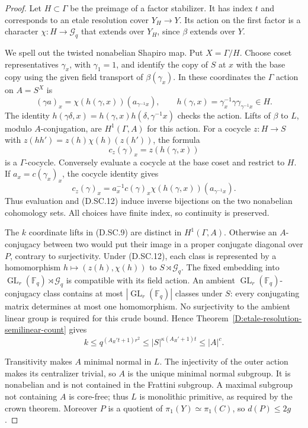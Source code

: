 \begin{proof}
Let $H\subset\Gamma$ be the preimage of a factor
stabilizer. It has index $t$ and corresponds to an etale
resolution cover $Y_H\to Y$. Its action on the first
factor is a character $\chi:H\to\mathcal G_q$ that
extends over $Y_H$, since $\beta$ extends over $Y$.

We spell out the twisted nonabelian Shapiro map. Put
$X=\Gamma/H$. Choose coset representatives $\gamma_x$,
with $\gamma_1=1$, and identify the copy of $S$ at $x$
with the base copy using the given field transport of
$\beta(\gamma_x)$. In these coordinates the $\Gamma$
action on $A=S^X$ is
\[
 (\gamma a)_x=\chi(h(\gamma,x))(a_{\gamma^{-1}x}),
 \qquad
 h(\gamma,x)=\gamma_x^{-1}\gamma\gamma_{\gamma^{-1}x}\in H.
                                                        \tag{D.SC.11}
\]
The identity
$h(\gamma\delta,x)=h(\gamma,x)h(\delta,\gamma^{-1}x)$
checks the action. Lifts of $\beta$ to $L$, modulo
$A$-conjugation, are $H^1(\Gamma,A)$ for this action.
For a cocycle $z:H\to S$ with
$z(hh')=z(h)\chi(h)(z(h'))$, the formula
\[
                    c_z(\gamma)_x=z(h(\gamma,x))       \tag{D.SC.12}
\]
is a $\Gamma$-cocycle. Conversely evaluate a cocycle at
the base coset and restrict to $H$. If
$a_x=c(\gamma_x)_x$, the cocycle identity gives
\[
 c_z(\gamma)_x=a_x^{-1}c(\gamma)_x
                      \chi(h(\gamma,x))(a_{\gamma^{-1}x}).
                                                        \tag{D.SC.13}
\]
Thus evaluation and (D.SC.12) induce inverse bijections
on the two nonabelian cohomology sets. All choices have
finite index, so continuity is preserved.

The $k$ coordinate lifts in (D.SC.9) are distinct in
$H^1(\Gamma,A)$. Otherwise an $A$-conjugacy between
two would put their image in a proper conjugate
diagonal over $P$, contrary to surjectivity. Under
(D.SC.12), each class is represented by a homomorphism
$h\mapsto(z(h),\chi(h))$ to
$S\rtimes\mathcal G_q$. The fixed embedding into
$\operatorname{GL}_r(\mathbb F_q)\rtimes\mathcal G_q$
is compatible with its field action. An ambient
$\operatorname{GL}_r(\mathbb F_q)$-conjugacy class
contains at most $|\operatorname{GL}_r(\mathbb F_q)|$
classes under $S$: every conjugating matrix determines
at most one homomorphism. No surjectivity to the ambient
linear group is required for this crude bound. Hence
Theorem~\ref{D:etale-resolution-semilinear-count} gives
\[
 k\leq q^{(A_R't+1)r^2}
       \leq |S|^{\kappa(A_R'+1)t}\leq |A|^c.           \tag{D.SC.14}
\]

Transitivity makes $A$ minimal normal in $L$. The
injectivity of the outer action makes its centralizer
trivial, so $A$ is the unique minimal normal subgroup.
It is nonabelian and is not contained in the Frattini
subgroup. A maximal subgroup not containing $A$ is
core-free; thus $L$ is monolithic primitive, as required
by the crown theorem. Moreover $P$ is a quotient of
$\pi_1(Y)\simeq\pi_1(C)$, so $d(P)\leq2g$.


\end{proof}

